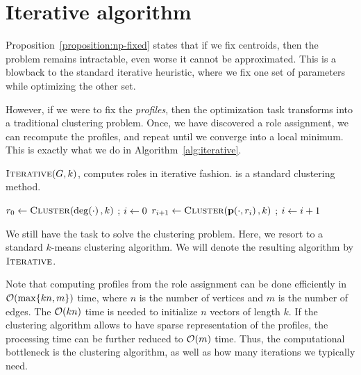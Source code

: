 \section{Iterative algorithm}
\label{sec:kmeans}

Proposition~\ref{proposition:np-fixed} states that if we fix centroids, then
the problem remains intractable, even worse it cannot be approximated. This is
a blowback to the standard iterative heuristic, where we fix one set of parameters
while optimizing the other set.

However, if we were to fix the \emph{profiles}, then the optimization task
transforms into a traditional clustering problem. Once, we have discovered a
role assignment, we can recompute the profiles, and repeat until we converge
into a local minimum. This is exactly what we do in Algorithm~\ref{alg:iterative}.

\begin{algorithm}
\caption{$\textsc{Iterative}(G, k)$, computes roles in iterative fashion.
\algcluster is a standard clustering method.}
\label{alg:iterative}
$r_0 \define \algcluster(\dg{\cdot}, k)$ ;
$i \leftarrow 0$\;
 {
	$r_{i + 1} \define \algcluster(\prof{\cdot, r_i}, k)$ ;
	$i \leftarrow i + 1$\;
}
\end{algorithm}

We still have the task to solve the clustering problem. Here, we resort to a
standard $k$-means clustering algorithm. We will denote the resulting algorithm
by $\textsc{Iterative}$.

Note that computing profiles from the role assignment can be done efficiently
in $\bigO{\max\{kn, m\}}$ time, where $n$ is the number of vertices and $m$ is
the number of edges. The $\bigO{kn}$ time is needed to initialize $n$ vectors of length $k$.
If the clustering algorithm allows to have sparse representation
of the profiles, the processing time can be further reduced to $\bigO{m}$ time.
Thus, the computational bottleneck is the clustering algorithm, as
well as how many iterations we typically need. %
